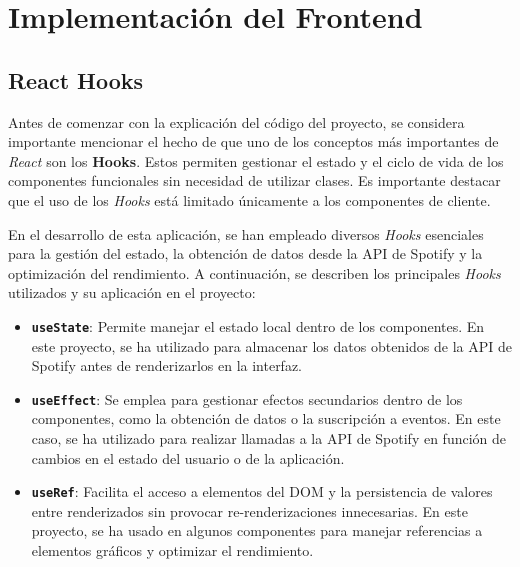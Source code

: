

\section{Implementación del Frontend}

\subsection{React Hooks}

Antes de comenzar con la explicación del código del proyecto, se considera importante mencionar el hecho de que uno de los conceptos más importantes de \textit{React} son los \textbf{Hooks}. Estos permiten gestionar el estado y el ciclo de vida de los componentes funcionales sin necesidad de utilizar clases. Es importante destacar que el uso de los \textit{Hooks} está limitado únicamente a los componentes de cliente.

En el desarrollo de esta aplicación, se han empleado diversos \textit{Hooks} esenciales para la gestión del estado, la obtención de datos desde la API de Spotify y la optimización del rendimiento. A continuación, se describen los principales \textit{Hooks} utilizados y su aplicación en el proyecto:

\begin{itemize}
    \item \textbf{\texttt{useState}}: Permite manejar el estado local dentro de los componentes. En este proyecto, se ha utilizado para almacenar los datos obtenidos de la API de Spotify antes de renderizarlos en la interfaz.

    \item \textbf{\texttt{useEffect}}: Se emplea para gestionar efectos secundarios dentro de los componentes, como la obtención de datos o la suscripción a eventos. En este caso, se ha utilizado para realizar llamadas a la API de Spotify en función de cambios en el estado del usuario o de la aplicación.

    \item \textbf{\texttt{useRef}}: Facilita el acceso a elementos del DOM y la persistencia de valores entre renderizados sin provocar re-renderizaciones innecesarias. En este proyecto, se ha usado en algunos componentes para manejar referencias a elementos gráficos y optimizar el rendimiento.
\end{itemize}

